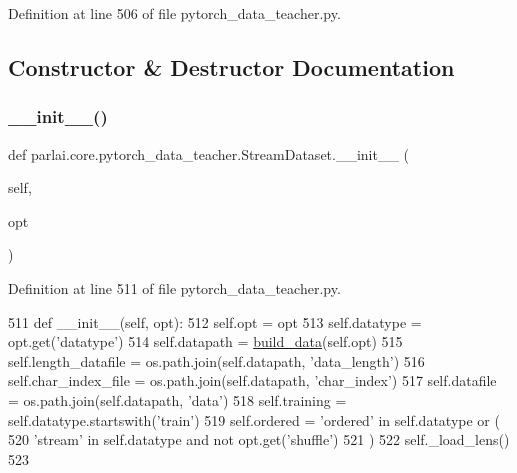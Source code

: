 Definition at line 506 of file pytorch\+\_\+data\+\_\+teacher.\+py.



\subsection{Constructor \& Destructor Documentation}
\mbox{\label{classparlai_1_1core_1_1pytorch__data__teacher_1_1StreamDataset_a1898c0967d1cf4eef62a70d48f35f6fb}} 
\subsubsection{\texorpdfstring{\+\_\+\+\_\+init\+\_\+\+\_\+()}{\_\_init\_\_()}}
{\footnotesize\ttfamily def parlai.\+core.\+pytorch\+\_\+data\+\_\+teacher.\+Stream\+Dataset.\+\_\+\+\_\+init\+\_\+\+\_\+ (\begin{DoxyParamCaption}\item[{}]{self,  }\item[{}]{opt }\end{DoxyParamCaption})}



Definition at line 511 of file pytorch\+\_\+data\+\_\+teacher.\+py.


\begin{DoxyCode}
511     \textcolor{keyword}{def }\_\_init\_\_(self, opt):
512         self.opt = opt
513         self.datatype = opt.get(\textcolor{stringliteral}{'datatype'})
514         self.datapath = \hyperlink{namespaceparlai_1_1scripts_1_1build__pytorch__data_a50d93b1dec37499085b9eafc6e425a1a}{build\_data}(self.opt)
515         self.length\_datafile = os.path.join(self.datapath, \textcolor{stringliteral}{'data\_length'})
516         self.char\_index\_file = os.path.join(self.datapath, \textcolor{stringliteral}{'char\_index'})
517         self.datafile = os.path.join(self.datapath, \textcolor{stringliteral}{'data'})
518         self.training = self.datatype.startswith(\textcolor{stringliteral}{'train'})
519         self.ordered = \textcolor{stringliteral}{'ordered'} \textcolor{keywordflow}{in} self.datatype \textcolor{keywordflow}{or} (
520             \textcolor{stringliteral}{'stream'} \textcolor{keywordflow}{in} self.datatype \textcolor{keywordflow}{and} \textcolor{keywordflow}{not} opt.get(\textcolor{stringliteral}{'shuffle'})
521         )
522         self.\_load\_lens()
523 
\end{DoxyCode}


